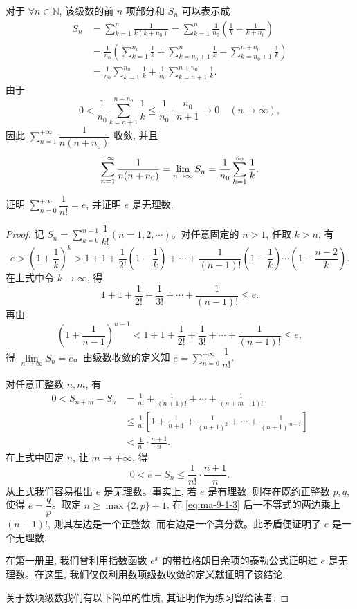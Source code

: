 \begin{solve}
对于 $\forall n\in\mathbb N$, 该级数的前 $n$ 项部分和 $S_n$ 可以表示成
\[
\begin{aligned}
  S_n
  &=\sum_{k=1}^n\frac1{k(k+n_0)}
    =\sum_{k=1}^n\frac1{n_0}\left(\frac1k-\frac1{k+n_0}\right)\\
  &=\frac1{n_0}\left(\sum_{k=1}^{n_0}\frac1k+\sum_{k=n_0+1}^n\frac1k-\sum_{k=n_0+1}^{n+n_0}\frac1k\right)\\
  &=\frac1{n_0}\sum_{k=1}^{n_0}\frac1k+\frac1{n_0}\sum_{k=n+1}^{n+n_0}\frac1k.
\end{aligned}
\]
由于
\[
  0<\frac1{n_0}\sum_{k=n+1}^{n+n_0}\frac1k\leq \frac1{n_0}\cdot\frac{n_0}{n+1}\to0\quad(n\to\infty),
\]
因此 $\sum\limits_{n=1}^{+\infty}\dfrac1{n(n+n_0)}$ 收敛, 并且
\[
  \sum_{n=1}^{+\infty}\frac1{n(n+n_0)}
  =\lim_{n\to\infty}S_n=\frac1{n_0}\sum_{k=1}^{n_0}\frac1k.
\qedhere
\]
\end{solve}


\begin{example}\label{example:ma-9-1-3}
证明 $\sum\limits_{n=0}^{+\infty}\dfrac1{n!}=e$, 并证明 $e$ 是无理数.
\end{example}


\begin{proof}
记 $S_n=\sum\limits_{k=0}^{n-1}\dfrac1{k!}(n=1,2,\cdots)$。对任意固定的 $n>1$, 任取 $k>n$, 有
\[
  e>\left(1+\frac1k\right)^k
  >1+1+\frac1{2!}\left(1-\frac1k\right)+\cdots+\frac1{(n-1)!}\left(1-\frac1k\right)\cdots\left(1-\frac{n-2}{k}\right).
\]
在上式中令 $k\to\infty$, 得
\[
  1+1+\frac1{2!}+\frac1{3!}+\cdots+\frac1{(n-1)!}\leq e.
\]
再由
\[
  \left(1+\frac1{n-1}\right)^{n-1}<1+1+\frac1{2!}+\frac1{3!}+\cdots+\frac1{(n-1)!}\leq e,
\]
得 $\lim\limits_{n\to\infty}S_n=e$。由级数收敛的定义知 $e=\sum\limits_{n=0}^{+\infty}\dfrac1{n!}$.

对任意正整数 $n,m$, 有
\[
\begin{aligned}
  0<S_{n+m}-S_n
  &=\frac1{n!}+\frac1{(n+1)!}+\cdots+\frac1{(n+m-1)!}\\
  &\leq\frac1{n!}\left[1+\frac1{n+1}+\frac1{(n+1)^2}+\cdots+\frac1{(n+1)^{m-1}}\right]\\
  &<\frac1{n!}\cdot\frac{n+1}{n}.
\end{aligned}
\]
在上式中固定 $n$, 让 $m\to+\infty$, 得
\begin{equation}
  0<e-S_n\leq\frac1{n!}\cdot\frac{n+1}{n}.
  \label{eq:ma-9-1-3}
\end{equation}
从上式我们容易推出 $e$ 是无理数。事实上, 若 $e$ 是有理数, 则存在既约正整数 $p,q$, 使得 $e=\dfrac qp$。取定 $n\geq\max\{2,p\}+1$, 在 \eqref{eq:ma-9-1-3} 后一不等式的两边乘上 $(n-1)!$, 则其左边是一个正整数, 而右边是一个真分数。此矛盾便证明了 $e$ 是一个无理数.

在第一册里, 我们曾利用指数函数 $e^x$ 的带拉格朗日余项的泰勒公式证明过 $e$ 是无理数。在这里, 我们仅仅利用数项级数收敛的定义就证明了该结论.

关于数项级数我们有以下简单的性质, 其证明作为练习留给读者.
\end{proof}


